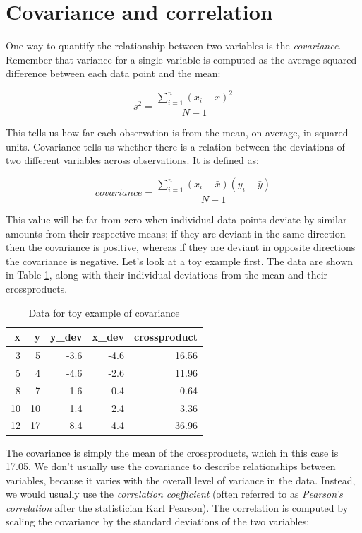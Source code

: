 \documentclass[12pt,]{book}
\theoremstyle{definition}
\theoremstyle{definition}
\theoremstyle{definition}
\theoremstyle{remark}
\begin{document}
\hypertarget{covariance-and-correlation}{%
\section{Covariance and correlation}\label{covariance-and-correlation}}

One way to quantify the relationship between two variables is the \emph{covariance}. Remember that variance for a single variable is computed as the average squared difference between each data point and the mean:

\[
s^2 = \frac{\sum_{i=1}^n (x_i - \bar{x})^2}{N - 1}
\]

This tells us how far each observation is from the mean, on average, in squared units. Covariance tells us whether there is a relation between the deviations of two different variables across observations. It is defined as:

\[
covariance = \frac{\sum_{i=1}^n (x_i - \bar{x})(y_i - \bar{y})}{N - 1}
\]

This value will be far from zero when individual data points deviate by similar amounts from their respective means; if they are deviant in the same direction then the covariance is positive, whereas if they are deviant in opposite directions the covariance is negative. Let's look at a toy example first. The data are shown in Table \ref{tab:covTable}, along with their individual deviations from the mean and their crossproducts.

\begin{table}

\caption{\label{tab:covTable}Data for toy example of covariance}
\centering
\begin{tabular}[t]{r|r|r|r|r}
\hline
x & y & y\_dev & x\_dev & crossproduct\\
\hline
3 & 5 & -3.6 & -4.6 & 16.56\\
\hline
5 & 4 & -4.6 & -2.6 & 11.96\\
\hline
8 & 7 & -1.6 & 0.4 & -0.64\\
\hline
10 & 10 & 1.4 & 2.4 & 3.36\\
\hline
12 & 17 & 8.4 & 4.4 & 36.96\\
\hline
\end{tabular}
\end{table}

The covariance is simply the mean of the crossproducts, which in this case is 17.05. We don't usually use the covariance to describe relationships between variables, because it varies with the overall level of variance in the data. Instead, we would usually use the \emph{correlation coefficient} (often referred to as \emph{Pearson's correlation} after the statistician Karl Pearson). The correlation is computed by scaling the covariance by the standard deviations of the two variables:
\end{document}
